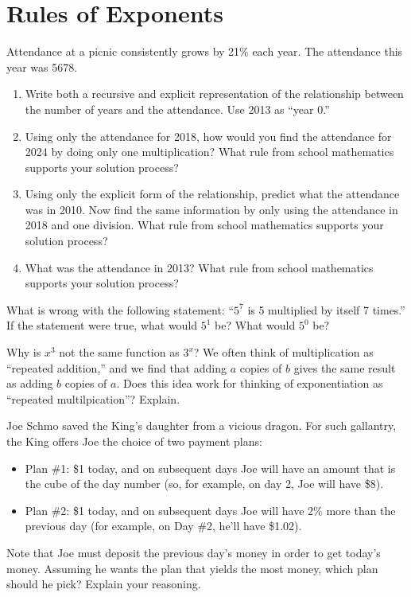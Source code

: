 \newpage
\section{Rules of Exponents}\label{A:ExponentRules}

\begin{prob}
Attendance at a picnic consistently grows by 21\% each year.  The attendance this year was 5678.    
\begin{enumerate}
\item Write both a recursive and explicit representation of the relationship between the number of years and the attendance.  Use 2013 as ``year 0.''

\item Using only the attendance for 2018, how would you find the attendance for 2024 by doing only one multiplication?  What rule from school mathematics supports your solution process?
      
\item Using only the explicit form of the relationship, predict what the attendance was in 2010.  Now find the same information by only using the attendance in 2018 and one division. What rule from school mathematics supports your solution process?
     
\item What was the attendance in 2013?  What rule from school mathematics supports your solution process?
\end{enumerate}
\end{prob}
\begin{prob}
What is wrong with the following statement:  ``$5^7$ is 5 multiplied by itself 7 times.''  If the statement were true, what would $5^1$ be?  What would $5^0$ be?
\end{prob}
\begin{prob}
Why is $x^3$ not the same function as $3^x$?  We often think of multiplication as ``repeated addition,'' and we find that adding $a$ copies of $b$ gives the same result as adding $b$ copies of $a$.  Does this idea work for thinking of exponentiation as ``repeated multilpication''?  Explain.  
\end{prob}

\begin{prob}
Joe Schmo saved the King's daughter from a vicious dragon.  For such gallantry, the King offers Joe the choice of two payment plans: 
\begin{itemize}
\item Plan \#1:  \$1 today, and on subsequent days Joe will have an amount that is the cube of the day number (so, for example, on day 2, Joe  will have \$8). 
\item Plan \#2:  \$1 today, and on subsequent days Joe will have 2\% more than the previous day (for example, on Day \#2, he'll have \$1.02).  
\end{itemize}
Note that Joe must deposit the previous day's money in order to get today's money.  Assuming he wants the plan that yields the most money, which plan should he pick?  Explain your reasoning.  
\end{prob}
